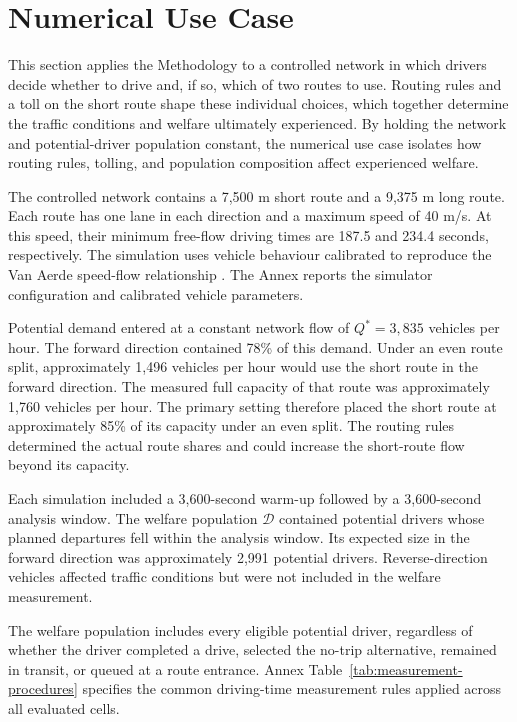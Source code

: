 \documentclass{article}
\begin{document}
\clearpage

\section{Numerical Use Case}

This section applies the Methodology to a controlled network in which drivers decide whether to drive and, if so, which of two routes to use. Routing rules and a toll on the short route shape these individual choices, which together determine the traffic conditions and welfare ultimately experienced. By holding the network and potential-driver population constant, the numerical use case isolates how routing rules, tolling, and population composition affect experienced welfare.

The controlled network contains a 7,500 m short route and a 9,375 m long route. Each route has one lane in each direction and a maximum speed of 40 m/s. At this speed, their minimum free-flow driving times are 187.5 and 234.4 seconds, respectively. The simulation uses vehicle behaviour calibrated to reproduce the Van Aerde speed-flow relationship \parencite{vanAerdeYagar1983,vanAerdeRakha1995}. The Annex reports the simulator configuration and calibrated vehicle parameters.

Potential demand entered at a constant network flow of $Q^*=3{,}835$ vehicles per hour. The forward direction contained 78\% of this demand. Under an even route split, approximately 1,496 vehicles per hour would use the short route in the forward direction. The measured full capacity of that route was approximately 1,760 vehicles per hour. The primary setting therefore placed the short route at approximately 85\% of its capacity under an even split. The routing rules determined the actual route shares and could increase the short-route flow beyond its capacity.

Each simulation included a 3,600-second warm-up followed by a 3,600-second analysis window. The welfare population $\mathcal D$ contained potential drivers whose planned departures fell within the analysis window. Its expected size in the forward direction was approximately 2,991 potential drivers. Reverse-direction vehicles affected traffic conditions but were not included in the welfare measurement.

The welfare population includes every eligible potential driver, regardless of whether the driver completed a drive, selected the no-trip alternative, remained in transit, or queued at a route entrance. Annex Table~\ref{tab:measurement-procedures} specifies the common driving-time measurement rules applied across all evaluated cells.
\end{document}
